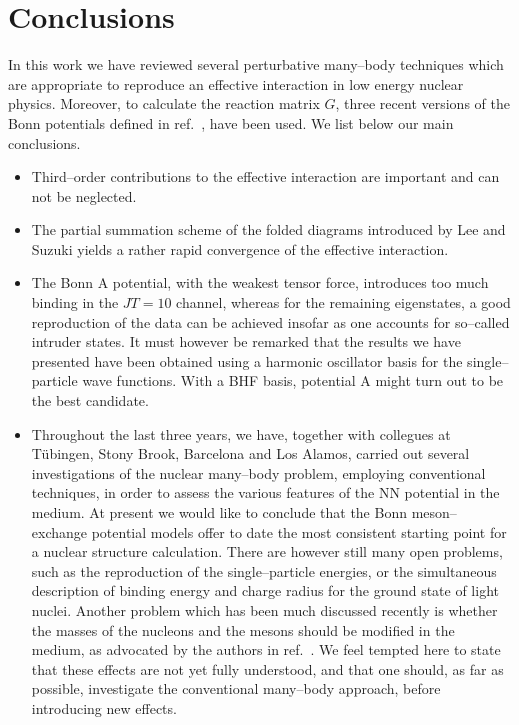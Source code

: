 \section{Conclusions}
In this work we have reviewed several perturbative 
many--body techniques which are appropriate
to reproduce an effective interaction in low energy nuclear physics. Moreover,
to calculate the reaction matrix $G$, three recent versions of the Bonn potentials
defined in ref.\ \cite{mac89}, have been used. We list below our main conclusions.
\begin{itemize}
\item  Third--order contributions to the effective interaction
 are important and can not be neglected.
\item The partial summation scheme of the folded diagrams introduced by
Lee and Suzuki \cite{ls80} yields a rather rapid convergence of the 
effective interaction.
\item The Bonn A potential, with the weakest tensor force, introduces too much
binding in the $JT=10$ channel, whereas for the remaining eigenstates, a good
reproduction of the data can be achieved insofar as one accounts for so--called
intruder states. It must however be remarked that the results we have 
presented have been obtained using a harmonic oscillator basis for the 
single--particle wave functions. With a BHF basis, potential A might turn out
to be the best candidate. 
\item Throughout the last three years, we have, together with collegues
at  T\"{u}bingen, Stony Brook, Barcelona  and Los Alamos, carried
out several investigations of the nuclear many--body problem, employing
conventional techniques, in order to assess the various features of the NN 
potential in the medium. At present we would like to conclude that the Bonn
meson--exchange potential models offer to date the most consistent starting
point for a nuclear structure calculation. There are however still many open
problems, such as the reproduction of the single--particle energies, or the 
simultaneous description of binding energy and charge radius for the 
ground state of light nuclei. Another problem which has been much discussed
recently is whether the masses of the nucleons and the mesons should be modified
in the medium, as advocated by the authors in ref.\ \cite{bmp90}. 
We feel tempted here to state that these effects are not yet 
fully understood, and that one should, as far as possible, 
investigate the conventional many--body
approach, before introducing new effects. 
\end{itemize}

